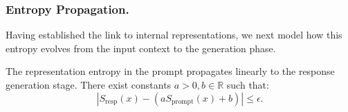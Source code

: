 

% 
\noindent %
\subsubsection{Entropy Propagation.}

\begin{figure} 
    \vspace{-20pt} %
    \centering
    
    
    
    
    \vspace{-10pt} %
\end{figure}

Having established the link to internal representations, we next model how this entropy evolves from the input context to the generation phase.

\begin{assumption}
\label{ass:propagation}
The representation entropy in the prompt propagates linearly to the response generation stage. There exist constants $a > 0, b \in \mathbb{R}$ such that:
\begin{equation}
  |S_{\text{resp}}(x) - (a S_{\text{prompt}}(x) + b)| \le \epsilon.
\end{equation}
\end{assumption}

